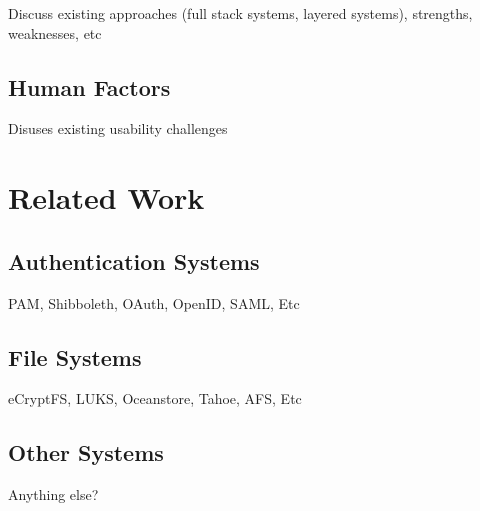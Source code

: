 Discuss existing approaches (full stack systems, layered systems),
strengths, weaknesses, etc

\subsection{Human Factors}

Disuses existing usability challenges

\section{Related Work}

\subsection{Authentication Systems}

PAM, Shibboleth, OAuth, OpenID, SAML, Etc

\subsection{File Systems}

eCryptFS, LUKS, Oceanstore, Tahoe, AFS, Etc

\subsection{Other Systems}

Anything else?

